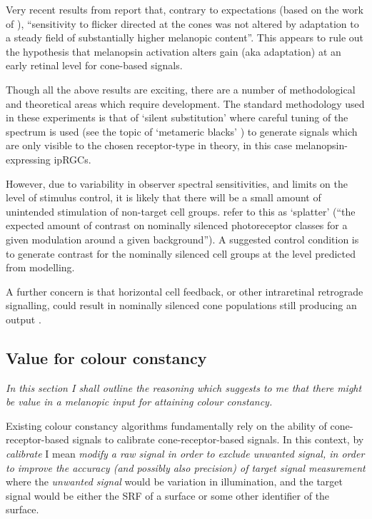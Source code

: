 Very recent results from \textbf{\citet{vincent_adaptation_2019,vincent_adaptation_2019-1}} report that, contrary to expectations (based on the work of \citet{allen_melanopsin-driven_2014}), ``sensitivity to flicker directed at the cones was not altered by adaptation to a steady field of substantially higher melanopic content''. This appears to rule out the hypothesis that melanopsin activation alters gain (aka adaptation) at an early retinal level for cone-based signals.

Though all the above results are exciting, there are a number of methodological and theoretical areas which require development. The standard methodology used in these experiments is that of `silent substitution' \citep{estevez_silent_1982,kamar_silent-substitution_2019,spitschan_method_2018} where careful tuning of the spectrum is used (see the topic of `metameric blacks' \citep{vienot_verriest_2014,cohen_metameric_1982,vienot_domain_2012,vienot_dimensionality_2015}) to generate signals which are only visible to the chosen receptor-type in theory, in this case melanopsin-expressing \glspl{ipRGC}. 

However, due to variability in observer spectral sensitivities, and limits on the level of stimulus control, it is likely that there will be a small amount of unintended stimulation of non-target cell groups. \citet{spitschan_selective_2015} refer to this as `splatter' (``the expected amount of contrast on nominally silenced photoreceptor classes for a given modulation around a given background''). A suggested control condition is to generate contrast for the nominally silenced cell groups at the level predicted from modelling.

A further concern is that horizontal cell feedback, or other intraretinal retrograde signalling, could result in nominally silenced cone populations still producing an output \citep{kamar_silent-substitution_2019}.

\subsection{Value for colour constancy}
\label{sec:val}

\emph{In this section I shall outline the reasoning which suggests to me that there might be value in a melanopic input for attaining colour constancy.}

Existing colour constancy algorithms fundamentally rely on the ability of cone-receptor-based signals to calibrate cone-receptor-based signals. In this context, by \emph{calibrate} I mean  \emph{modify a raw signal in order to exclude unwanted signal, in order to improve the accuracy (and possibly also precision) of target signal measurement} where the \emph{unwanted signal} would be variation in illumination, and the target signal would be either the \gls{SRF} of a surface or some other identifier of the surface.

